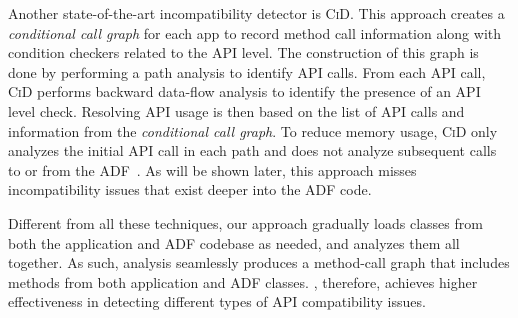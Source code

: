 Another state-of-the-art incompatibility detector is
\textsc{CiD}\cite{lili2018cid}. This approach creates a
\emph{conditional call graph} for each app to record
method call information along with condition checkers
related to the API level. The construction of this graph is
done by performing a path analysis to identify API
calls. From each API call, \textsc{CiD} performs
backward data-flow analysis to identify the presence of
an API level check. Resolving API usage is then based
on the list of API calls and information from the
\emph{conditional call graph}.  To reduce memory usage,
\textsc{CiD} only analyzes the initial API call in each path and
does not analyze subsequent calls to or from the
ADF~\cite{lili2018cid}.  As will be shown later, this
approach misses incompatibility issues that exist
deeper into the ADF code.  


Different from all these techniques, our approach
gradually loads classes from both the
application and ADF codebase as needed, and analyzes them all together.  As such, \@approach analysis seamlessly produces a method-call graph that includes methods from both application and ADF classes.  \@approach, therefore, achieves higher effectiveness in detecting different types of API compatibility issues. 


